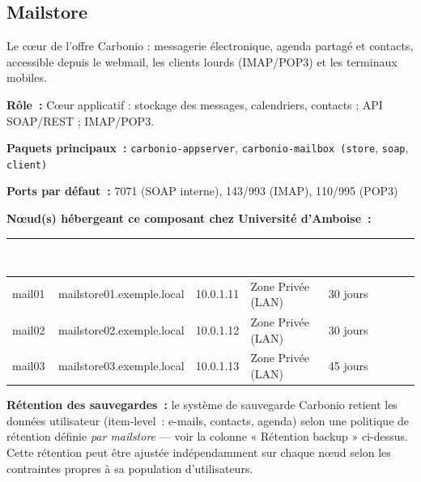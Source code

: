 \documentclass[11pt,a4paper]{report}
\newcommand{\tblhead}[1]{\textcolor{white}{\textbf{#1}}}
\begin{document}
\subsection{Mailstore}

Le cœur de l'offre Carbonio : messagerie électronique, agenda partagé et contacts, accessible depuis le webmail, les clients lourds (IMAP/POP3) et les terminaux mobiles.\allowbreak{}

\textbf{Rôle~:} Cœur applicatif : stockage des messages, calendriers, contacts ; API SOAP/REST ; IMAP/POP3.\allowbreak{}


\textbf{Paquets principaux~:} \texttt{carbonio-\allowbreak{}appserver}, \texttt{carbonio-\allowbreak{}mailbox (store}, \texttt{soap}, \texttt{client)}

\textbf{Ports par défaut~:} 7071 (SOAP interne), 143/993 (IMAP), 110/995 (POP3)

\textbf{Nœud(s) hébergeant ce composant chez Université d'Amboise~:}
\begin{longtable}{|p{2.6cm}|p{4cm}|p{2.6cm}|p{2cm}|p{2.3cm}|}
\hline
\rowcolor{primary}\tblhead{Nœud} & \tblhead{Hostname} & \tblhead{IP} & \tblhead{Zone} & \tblhead{Rétention backup} \\
\hline
\endhead
mail01 & mailstore01.\allowbreak{}exemple.\allowbreak{}local & 10.\allowbreak{}0.\allowbreak{}1.\allowbreak{}11 & Zone Privée (LAN) & 30 jours \\
\hline
mail02 & mailstore02.\allowbreak{}exemple.\allowbreak{}local & 10.\allowbreak{}0.\allowbreak{}1.\allowbreak{}12 & Zone Privée (LAN) & 30 jours \\
\hline
mail03 & mailstore03.\allowbreak{}exemple.\allowbreak{}local & 10.\allowbreak{}0.\allowbreak{}1.\allowbreak{}13 & Zone Privée (LAN) & 45 jours \\
\hline
\end{longtable}

\textbf{Rétention des sauvegardes~:} le système de sauvegarde Carbonio retient les données utilisateur (item-level~: e-mails, contacts, agenda) selon une politique de rétention définie \emph{par mailstore} --- voir la colonne « Rétention backup » ci-dessus. Cette rétention peut être ajustée indépendamment sur chaque nœud selon les contraintes propres à sa population d'utilisateurs.
\end{document}

